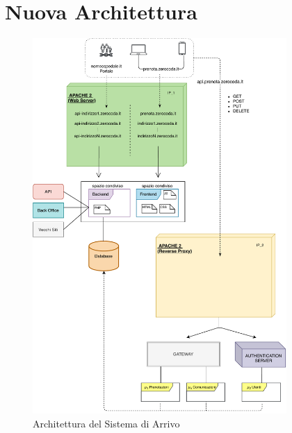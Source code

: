 \section{Nuova Architettura}
\begin{figure}[H]
    \centering
    \includegraphics[width=0.86\textwidth]{images/02_6_new_architecture.pdf}
    \caption{Architettura del Sistema di Arrivo}
    \label{fig:newarchitecture}
\end{figure}

